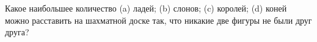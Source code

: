 Какое наибольшее количество (a) ладей; (b) слонов; (c) королей; (d) коней можно расставить на шахматной доске так, что никакие две фигуры не были друг друга?